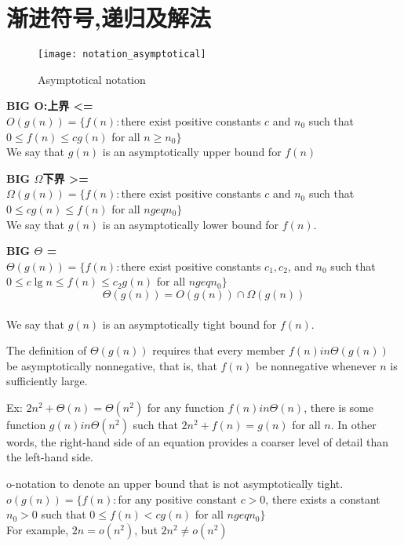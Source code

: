 \documentclass{article}
\begin{document}
\section{渐进符号,递归及解法}
\begin{definition}
\begin{figure}[htbp]
  \centering
  \texttt{[image: notation\_asymptotical]}\\
  \caption{Asymptotical notation}\label{fig.notation.asymptotical}
\end{figure}
\textbf{BIG O:上界 <=}\\
$O(g(n)) = \{f(n): $there exist positive constants $c$ and $n_0$ such that $0 \leq f(n) \leq cg(n)$ for all $n \geq n_0\}$\\
We say that $g(n)$ is an asymptotically upper bound for $f(n)$

\textbf{BIG $\Omega$下界 >=}\\
$\Omega(g(n)) = \{f(n): $there exist positive constants $c$ and $n_0$ such that $0\leq cg(n)\leq f(n)$ for all $n geq n_0\}$\\
We say that $g(n)$ is an asymptotically lower bound for $f(n)$.

\textbf{BIG $\Theta$ =}\\
$\Theta(g(n)) = \{f(n) : $there exist positive constants $c_1, c_2$, and $n_0$ such that $0\leq c\lg n\leq f(n)\leq c_2g(n)$ for all $n geq n_0\}$\\
$$\Theta(g(n))=O(g(n)) \cap \Omega(g(n)) $$\\
We say that $g(n)$ is an asymptotically tight bound for $f(n)$.

The definition of $\Theta(g(n))$ requires that every member $f(n) in \Theta(g(n))$ be asymptotically nonnegative, that is, that $f(n)$ be nonnegative whenever $n$ is sufficiently large.
\end{definition}

Ex:
$2n^2 + \Theta(n) = \Theta(n^2)$
for any function $f(n) in \Theta(n)$, there is some function $g(n) in \Theta(n^2)$ such that $2n^2 + f(n) = g(n)$ for all $n$. In other words, the right-hand side of an equation provides a coarser level of detail than the left-hand side.

o-notation
to denote an upper bound that is not asymptotically tight.\\
$o(g(n)) = \{f(n) : $for any positive constant $c > 0$, there exists a constant $n_0 > 0$ such that $0 \leq f(n) < cg(n)$ for all $n geq n_0\}$\\
For example, $2n = o(n^2)$, but $2n^2 \neq o(n^2)$
\end{document}
